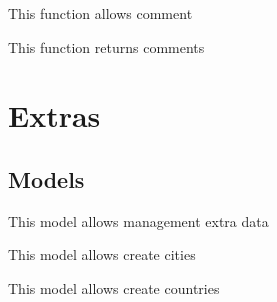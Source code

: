 \documentclass[letterpaper,10pt,english]{sphinxmanual}
\begin{document}
\begin{fulllineitems}
\label{modules/comment:apps.comments.views.comment}
This function allows comment

\end{fulllineitems}


\begin{fulllineitems}
\label{modules/comment:apps.comments.views.getComments}
This function returns comments

\end{fulllineitems}



\section{Extras}
\label{modules/extras:extras}\label{modules/extras::doc}

\subsection{Models}
\label{modules/extras:models}
This model allows management extra data
\label{modules/extras:module-apps.extras.models}

\begin{fulllineitems}
\label{modules/extras:apps.extras.models.City}
This model allows create cities

\end{fulllineitems}


\begin{fulllineitems}
\label{modules/extras:apps.extras.models.Country}
This model allows create countries

\end{fulllineitems}

\end{document}

